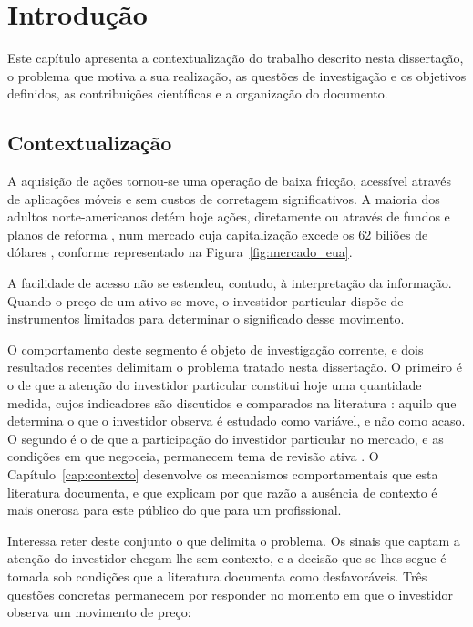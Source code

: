 \chapter{Introdução}
\label{cap:introducao}

Este capítulo apresenta a contextualização do trabalho descrito nesta dissertação, o problema
que motiva a sua realização, as questões de investigação e os objetivos definidos, as
contribuições científicas e a organização do documento.

\section{Contextualização}
\label{sec:intro_origem}

A aquisição de ações tornou-se uma operação de baixa fricção, acessível através de aplicações
móveis e sem custos de corretagem significativos. A maioria dos adultos norte-americanos detém
hoje ações, diretamente ou através de fundos e planos de reforma \autocite{gallup2025stock}, num
mercado cuja capitalização excede os 62 biliões de dólares \autocite{sifma2025factbook}, conforme
representado na Figura~\ref{fig:mercado_eua}.

A facilidade de acesso não se estendeu, contudo, à interpretação da informação. Quando o preço de
um ativo se move, o investidor particular dispõe de instrumentos limitados para determinar o
significado desse movimento.

O comportamento deste segmento é objeto de investigação corrente, e dois resultados recentes
delimitam o problema tratado nesta dissertação. O primeiro é o de que a atenção do investidor
particular constitui hoje uma quantidade medida, cujos indicadores são discutidos e comparados na
literatura \autocite{cahill2025attention}: aquilo que determina o que o investidor observa é
estudado como variável, e não como acaso. O segundo é o de que a participação do investidor
particular no mercado, e as condições em que negoceia, permanecem tema de revisão ativa
\autocite{ernst2026retail}. O Capítulo~\ref{cap:contexto} desenvolve os mecanismos
comportamentais que esta literatura documenta, e que explicam por que razão a ausência de contexto
é mais onerosa para este público do que para um profissional.

Interessa reter deste conjunto o que delimita o problema. Os sinais que captam a atenção do
investidor chegam-lhe sem contexto, e a decisão que se lhes segue é tomada sob condições que a
literatura documenta como desfavoráveis. Três questões concretas permanecem por responder no
momento em que o investidor observa um movimento de preço:

